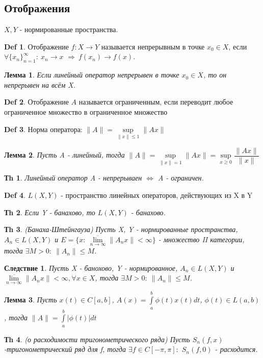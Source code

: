 \documentclass[14pt]{article}
\theoremstyle{plain}
\newtheorem{Thm}{Тh}
\newtheorem{Lem}{Лемма}
\newtheorem{Sled}{Следствие}
\theoremstyle{definition}
\newtheorem{Def}{Def}
\begin{document}
 		\subsection{Отображения}
 			$X, Y$ - нормированные пространства.
 			\begin{Def}
 				 Отображение $f: X \to Y$ называется непрерывным в точке $x_0 \in X$, если $\forall \{x_n\}_{n=1}^{\infty}: \ x_n \to x$ $\Rightarrow \ f(x_n)\to f(x)$.			
 			\end{Def}
 			\begin{Lem}
 				Если линейный оператор непрерывен в точке $x_0 \in X$, то он непрерывен на всём X. 
 			\end{Lem}
 			\begin{Def}
 				Отображение $A$ называется ограниченным, если переводит любое ограниченное множество в ограниченное множество
 			\end{Def}
 			\begin{Def}
 				Норма оператора: $\|A\| = \sup\limits_{\|x\| \leq 1} \|Ax\|$
 			\end{Def}
 			\begin{Lem}
 				Пусть A - линейный, тогда $\|A\| = \sup\limits_{\|x\| = 1} \|Ax\| = \sup\limits_{x \geq 0} \dfrac{\|Ax\|}{\|x\|}$
 			\end{Lem}
 			\begin{Thm}
 				Линейный оператор A - непрерываен $\Leftrightarrow$ A - ограничен. 
 			\end{Thm}
 			\begin{Def}
 				$L(X,Y)$ - пространство линейных операторов, действующих из X в Y
 			\end{Def}
 			\begin{Thm}
 				Если Y - банахово, то $L(X, Y)$ - банахово. 			
 			\end{Thm}
 			\begin{Thm}
 				(Банаха-Штейнгауза)\newline
 				Пусть X, Y - нормированные пространства, $A_n \in L(X,Y)$ и $E = \{x: \ \overline{\lim\limits_{n\to\infty}}\|A_nx\|< \infty \}$ - множество II категории, тогда $\exists M > 0: \ \|A_n\| \leq M$.	
 			\end{Thm}
 			\begin{Sled}
 				Пусть X - банохово, Y - нормированное, $A_n \in L(X,Y)$ и $\overline{\lim\limits_{n\to\infty}}\|A_nx\|< \infty, \forall x \in X$, тогда $\exists M > 0: \ \|A_n\| \leq M$. 
 			\end{Sled}
 			\begin{Lem}
 				Пусть $x(t) \in C[a,b]$, $A(x) = \int\limits_a^b \phi(t)x(t) dt$, $\phi(t) \in L(a,b)$, тогда  $\|A\| = \int\limits_a^b | \phi(t) | dt$
 			\end{Lem}
 			\begin{Thm}
 				(о расходимости тригонометрического ряда)\newline
 				Пусть $S_n(f,x)$ -тригонометрический ряд для f, тогда $\exists f \in C[-\pi, \pi]: $ $S_n(f,0)$ - расходится. 
 			\end{Thm}
\end{document}
